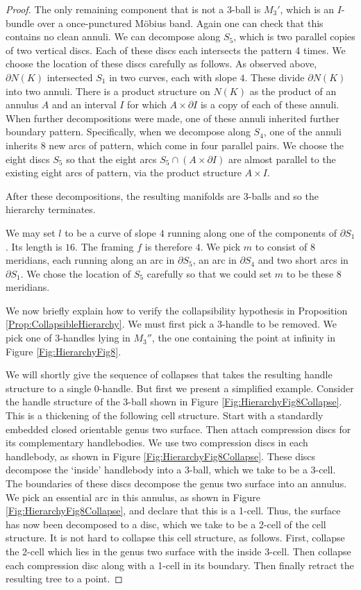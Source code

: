 \documentclass[oneside]{amsart}
\numberwithin{equation}{section}
\theoremstyle{plain}
\theoremstyle{definition}
\begin{document}
\begin{proof}
The only remaining component that is not a 3-ball is $M_3'$, which is an $I$-bundle over a once-punctured M\"obius band. Again one can check that this contains no clean annuli. We can decompose along $S_5$, which is two parallel copies of two vertical discs. Each of these discs each intersects the pattern 4 times. We choose the location of these discs carefully as follows. As observed above, $\partial N(K)$ intersected $S_1$ in two curves, each with slope $4$. These divide $\partial N(K)$ into two annuli. There is a product structure on $N(K)$ as the product of an annulus $A$ and an interval $I$ for which $A \times \partial I$ is a copy of each of these annuli. When further decompositions were made, one of these annuli inherited further boundary pattern. Specifically, when we decompose along $S_4$, one of the annuli inherits 8 new arcs of pattern, which come in four parallel pairs. We choose the eight discs $S_5$ so that the eight arcs $S_5 \cap (A \times \partial I)$ are almost parallel to the existing eight arcs of pattern, via the product structure $A \times I$.

After these decompositions, the resulting manifolds are 3-balls and so the hierarchy terminates.

We may set $l$ to be a curve of slope $4$ running along one of the components of $\partial S_1$. Its length is $16$. The framing $f$ is therefore $4$. We pick $m$ to consist of $8$ meridians, each running along an arc in $\partial S_5$, an arc in $\partial S_4$ and two short arcs in $\partial S_1$. We chose the location of $S_5$ carefully so that we could set $m$ to be these 8 meridians.

We now briefly explain how to verify the collapsibility hypothesis in Proposition \ref{Prop:CollapsibleHierarchy}. We must first pick a 3-handle to be removed. We pick one of 3-handles lying in $M_3''$, the one containing the point at infinity in Figure \ref{Fig:HierarchyFig8}.

We will shortly give the sequence of collapses that takes the resulting handle structure to a single 0-handle. But first we present a simplified example.
Consider the handle structure of the 3-ball shown in Figure \ref{Fig:HierarchyFig8Collapse}. This is a thickening of the following cell structure. Start with a standardly embedded closed orientable genus two surface. Then attach compression discs for its complementary handlebodies. We use two compression discs in each handlebody, as shown in Figure \ref{Fig:HierarchyFig8Collapse}. These discs decompose the `inside' handlebody into a 3-ball, which we take to be a 3-cell. The boundaries of these discs decompose the genus two surface into an annulus. We pick an essential arc in this annulus,
as shown in Figure \ref{Fig:HierarchyFig8Collapse}, and declare that this is a 1-cell. Thus, the surface has now been decomposed to a disc, which we take to be a 2-cell of the cell structure. It is not hard to collapse this cell structure, as follows. First, collapse the 2-cell which lies in the genus two surface with the inside 3-cell. Then collapse each compression disc along with a 1-cell in its boundary. Then finally retract the resulting tree to a point.


\end{proof}
\end{document}
